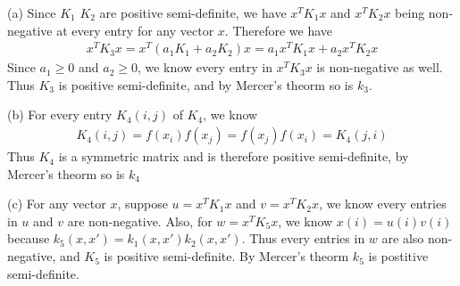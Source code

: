 \documentclass[12pt]{article}
\newenvironment{problem}[2][Problem]{\begin{trivlist}
\item[\hskip \labelsep {\bfseries #1}\hskip \labelsep {\bfseries #2}]}{\end{trivlist}}
\begin{document}
\begin{problem}{3. Kernels}
\item{(a)}
Since $K_1$ $K_2$ are positive semi-definite, we have $x^TK_1x$ and $x^TK_2x$ being non-negative at every entry for any vector $x$. Therefore we have
\begin{align*}
x^TK_3x = x^T(a_1K_1 + a_2K_2)x = a_1x^TK_1x + a_2x^TK_2x
\end{align*}
Since $a_1 \geq 0$ and $a_2 \geq 0$, we know every entry in $x^TK_3x$ is non-negative as well. Thus $K_3$ is positive semi-definite, and by Mercer's theorm so is $k_3$.
\\
\item{(b)} 
For every entry $K_4(i, j)$ of $K_4$, we know
\begin{align*}
K_4(i, j) = f(x_i)f(x_j) = f(x_j)f(x_i) = K_4(j, i)
\end{align*}
Thus $K_4$ is a symmetric matrix and is therefore positive semi-definite, by Mercer's theorm so is $k_4$
\item{(c)}
For any vector $x$, suppose $u = x^TK_1x$ and $v = x^TK_2x$, we know every entries in $u$ and $v$ are non-negative. Also, for $w = x^TK_5x$, we know $x(i) = u(i)v(i)$ because $k_5(x, x') = k_1(x, x')k_2(x, x')$. Thus every entries in $w$ are also non-negative, and $K_5$ is positive semi-definite. By Mercer's theorm $k_5$ is postitive semi-definite.
\end{problem}

 
\end{document}
